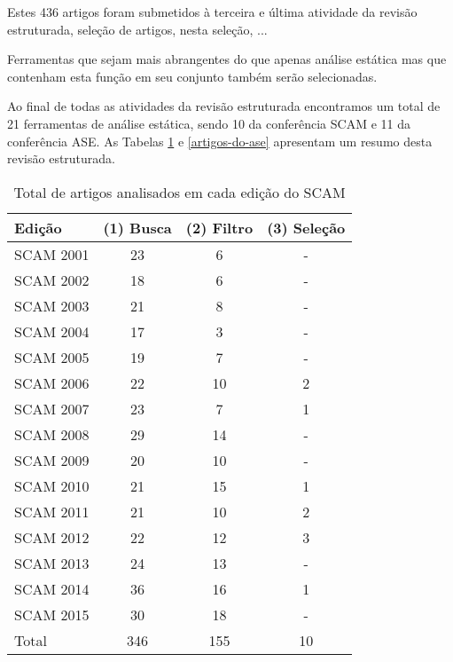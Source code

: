 Estes 436 artigos foram submetidos à terceira e última atividade da revisão estruturada,
seleção de artigos, nesta seleção, ...

Ferramentas que sejam mais abrangentes do
que apenas análise estática mas que contenham esta função em seu conjunto
também serão selecionadas.

Ao final de todas as atividades da revisão estruturada encontramos um total de
21 ferramentas de análise estática, sendo 10 da conferência SCAM e 11 da
conferência ASE. As Tabelas \ref{artigos-do-scam} e \ref{artigos-do-ase}
apresentam um resumo desta revisão estruturada.

\begin{table}[H]
\caption{Total de artigos analisados em cada edição do SCAM}
\centering
\begin{tabular}{| l | c | c | c |}
\hline
Edição & (1) Busca & (2) Filtro & (3) Seleção \\
\hline
SCAM 2001 & 23    & 6         & -           \\
SCAM 2002 & 18    & 6         & -           \\
SCAM 2003 & 21    & 8         & -           \\
SCAM 2004 & 17    & 3         & -           \\
SCAM 2005 & 19    & 7         & -           \\
SCAM 2006 & 22    & 10        & 2           \\
SCAM 2007 & 23    & 7         & 1           \\
SCAM 2008 & 29    & 14        & -           \\
SCAM 2009 & 20    & 10        & -           \\
SCAM 2010 & 21    & 15        & 1           \\
SCAM 2011 & 21    & 10        & 2           \\
SCAM 2012 & 22    & 12        & 3           \\
SCAM 2013 & 24    & 13        & -           \\
SCAM 2014 & 36    & 16        & 1           \\
SCAM 2015 & 30    & 18        & -           \\
\hline
Total     & 346   & 155       & 10          \\
\hline
\end{tabular}
\label{artigos-do-scam}
\end{table}

